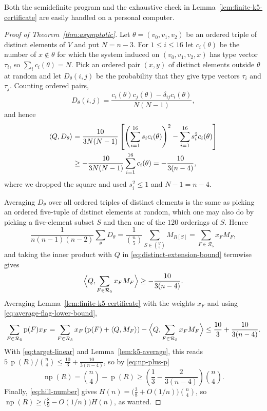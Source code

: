 \documentclass{article}
\theoremstyle{plain}
\theoremstyle{definition}
\theoremstyle{remark}
\newcommand{\np}{\operatorname{np}}
\newcommand{\p}{\operatorname{p}}
\begin{document}
Both the semidefinite program and the exhaustive check in Lemma~\ref{lem:finite-k5-certificate} are easily handled on a personal computer.

\begin{proof}[Proof of Theorem~\ref{thm:asymptotic}]
Let \(\theta=(v_0,v_1,v_2)\) be an ordered triple of distinct elements
of \(V\) and put \(N=n-3\).  For \(1\leq i\leq16\) let
\(c_i(\theta)\) be the number of \(x\notin\theta\) for which the
system induced on \((v_0,v_1,v_2,x)\) has type vector \(\tau_i\), so
\(\sum_ic_i(\theta)=N\).  Pick an ordered pair \((x,y)\) of distinct
elements outside \(\theta\) at random and let \(D_\theta(i,j)\) be the
probability that they give type vectors \(\tau_i\) and \(\tau_j\).
Counting ordered pairs,
\[
D_\theta(i,j)=
\frac{c_i(\theta)c_j(\theta)-\delta_{ij}c_i(\theta)}{N(N-1)},
\]
and hence
\begin{align}
\langle Q,D_\theta\rangle
&=\frac{10}{3N(N-1)}
\left[\left(\sum_{i=1}^{16}s_ic_i(\theta)\right)^2
-\sum_{i=1}^{16}s_i^2c_i(\theta)\right]\notag\\
&\geq-\frac{10}{3N(N-1)}\sum_{i=1}^{16}c_i(\theta)
=-\frac{10}{3(n-4)},
\label{eq:distinct-extension-bound}
\end{align}
where we dropped the square and used \(s_i^2\leq1\) and
\(N-1=n-4\).

Averaging \(D_\theta\) over all ordered triples of distinct elements
is the same as picking an ordered five-tuple of distinct elements at
random, which one may also do by picking a five-element subset \(S\)
and then one of the \(120\) orderings of \(S\).  Hence
\begin{equation}\label{eq:flag-matrix-average}
\frac{1}{n(n-1)(n-2)}\sum_{\theta}D_\theta
=\frac{1}{\binom n5}\sum_{S\in\binom V5}M_{R[S]}
=\sum_{F\in\mathcal R_5}x_FM_F ,
\end{equation}
and taking the inner product with \(Q\) in
\eqref{eq:distinct-extension-bound} termwise gives
\begin{equation}\label{eq:average-flag-lower-bound}
\Bigl\langle Q,\sum_{F\in\mathcal R_5}x_FM_F\Bigr\rangle
\geq-\frac{10}{3(n-4)} .
\end{equation}
Averaging Lemma~\ref{lem:finite-k5-certificate} with the weights
\(x_F\) and using \eqref{eq:average-flag-lower-bound},
\[
\sum_{F\in\mathcal R_5}\p(F)x_F
=\sum_{F\in\mathcal R_5}x_F
\left(\p(F)+\langle Q,M_F\rangle\right)
-\Bigl\langle Q,\sum_{F\in\mathcal R_5}x_FM_F\Bigr\rangle
\leq\frac{10}3+\frac{10}{3(n-4)} .
\]
With \eqref{eq:target-linear} and Lemma~\ref{lem:k5-average}, this
reads \(5\,\p(R)/\binom n4\leq\frac{10}3+\frac{10}{3(n-4)}\), so by
\eqref{eq:np-plus-p}
\[
\np(R)=\binom n4-\p(R)
\geq\left(\frac13-\frac{2}{3(n-4)}\right)\binom n4 .
\]
Finally, \eqref{eq:hill-number} gives
\(H(n)=\bigl(\frac38+O(1/n)\bigr)\binom n4\), so
\(\np(R)\geq\bigl(\frac89-O(1/n)\bigr)H(n)\), as wanted.
\end{proof}
\end{document}

